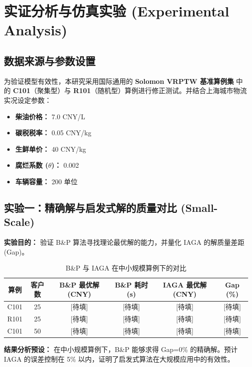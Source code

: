 \documentclass[11pt, a4paper]{article}
\begin{document}
\section{实证分析与仿真实验 (Experimental Analysis)}

\subsection{数据来源与参数设置}
为验证模型有效性，本研究采用国际通用的 \textbf{Solomon VRPTW 基准算例集} 中的 \textbf{C101}（聚集型）与 \textbf{R101}（随机型）算例进行修正测试。并结合上海城市物流实况设定参数：
\begin{itemize}
    \item \textbf{柴油价格：} 7.0 CNY/L
    \item \textbf{碳税税率：} 0.05 CNY/kg
    \item \textbf{生鲜单价：} 40 CNY/kg
    \item \textbf{腐烂系数 ($\theta$)：} 0.002
    \item \textbf{车辆容量：} 200 单位
\end{itemize}

\subsection{实验一：精确解与启发式解的质量对比 (Small-Scale)}
\textbf{实验目的：} 验证 B\&P 算法寻找理论最优解的能力，并量化 IAGA 的解质量差距 (Gap)。

\begin{table}[H]
    \centering
    \caption{B\&P 与 IAGA 在中小规模算例下的对比}
    \label{tab:comparison}
    \begin{tabular}{@{}cccccc@{}}
    \toprule
    \textbf{算例} & \textbf{客户数} & \textbf{B\&P 最优解 (CNY)} & \textbf{B\&P 耗时 (s)} & \textbf{IAGA 最优解 (CNY)} & \textbf{Gap (\%)} \\
    \midrule
    C101 & 25 & [待填] & [待填] & [待填] & [待填] \\
    R101 & 25 & [待填] & [待填] & [待填] & [待填] \\
    C101 & 50 & [待填] & [待填] & [待填] & [待填] \\
    \bottomrule
    \end{tabular}
\end{table}

\noindent \textbf{结果分析预设：} 在中小规模算例下，B\&P 能够求得 Gap=0\% 的精确解。预计 IAGA 的误差控制在 5\% 以内，证明了启发式算法在大规模应用中的有效性。
\end{document}
